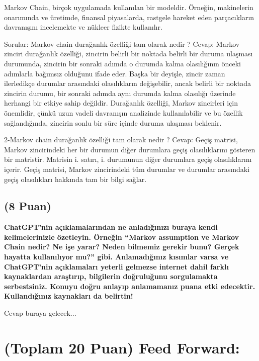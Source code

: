 \documentclass[11pt]{article}
\begin{document}
Markov Chain, birçok uygulamada kullanılan bir modeldir. Örneğin, makinelerin onarımında ve üretimde, finansal piyasalarda, rastgele hareket eden parçacıkların davranışını incelemekte ve nükleer fizikte kullanılır.

Sorular:-Markov chain durağanlık özelliği tam olarak nedir ?\newline
Cevap: Markov zinciri durağanlık özelliği, zincirin belirli bir noktada belirli bir duruma ulaşması durumunda, zincirin bir sonraki adımda o durumda kalma olasılığının önceki adımlarla bağımsız olduğunu ifade eder. Başka bir deyişle, zincir zaman ilerledikçe durumlar arasındaki olasılıkların değişebilir, ancak belirli bir noktada zincirin durumu, bir sonraki adımda aynı durumda kalma olasılığı üzerinde herhangi bir etkiye sahip değildir. Durağanlık özelliği, Markov zincirleri için önemlidir, çünkü uzun vadeli davranışın analizinde kullanılabilir ve bu özellik sağlandığında, zincirin sonlu bir süre içinde duruma ulaşması beklenir.

2-Markov chain durağanlık özelliği tam olarak nedir ?\newline
Cevap: Geçiş matrisi, Markov zincirindeki her bir durumun diğer durumlara geçiş olasılıklarını gösteren bir matristir. Matrisin i. satırı, i. durumunun diğer durumlara geçiş olasılıklarını içerir. Geçiş matrisi, Markov zincirindeki tüm durumlar ve durumlar arasındaki geçiş olasılıkları hakkında tam bir bilgi sağlar.

\subsection{(8 Puan)} \textbf{ChatGPT’nin açıklamalarından ne anladığınızı buraya kendi kelimelerinizle özetleyin. Örneğin ``Markov assumption ve Markov Chain nedir? Ne işe yarar? Neden bilmemiz gerekir bunu? Gerçek hayatta kullanılıyor mu?'' gibi. Anlamadığınız kısımlar varsa ve ChatGPT’nin açıklamaları yeterli gelmezse internet dahil farklı kaynaklardan araştırıp, bilgilerin doğruluğunu sorgulamakta serbestsiniz. Konuyu doğru anlayıp anlamamanız puana etki edecektir. Kullandığınız kaynakları da belirtin!}

Cevap buraya gelecek...

\section{(Toplam 20 Puan) Feed Forward:}
 
\end{document}

